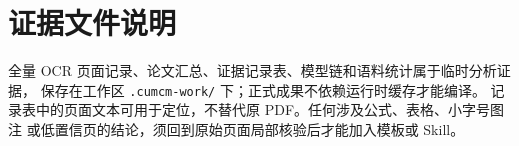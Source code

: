\section{证据文件说明}

全量 OCR 页面记录、论文汇总、证据记录表、模型链和语料统计属于临时分析证据，
保存在工作区 \texttt{.cumcm-work/} 下；正式成果不依赖运行时缓存才能编译。
记录表中的页面文本可用于定位，不替代原 PDF。任何涉及公式、表格、小字号图注
或低置信页的结论，须回到原始页面局部核验后才能加入模板或 Skill。


